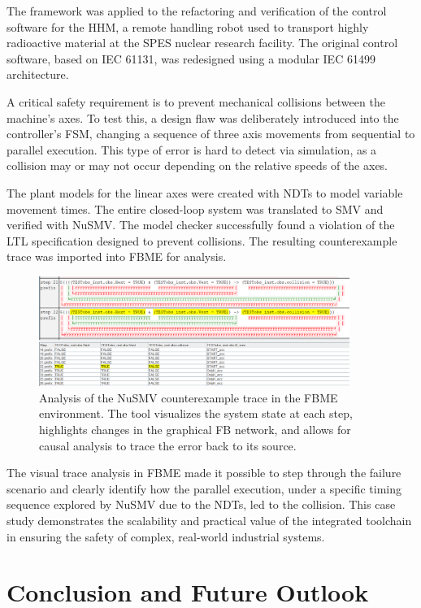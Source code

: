 The framework was applied to the refactoring and verification of the control software for the HHM, a remote handling robot used to transport highly radioactive material at the SPES nuclear research facility. The original control software, based on IEC 61131, was redesigned using a modular IEC 61499 architecture.

A critical safety requirement is to prevent mechanical collisions between the machine's axes. To test this, a design flaw was deliberately introduced into the controller's FSM, changing a sequence of three axis movements from sequential to parallel execution. This type of error is hard to detect via simulation, as a collision may or may not occur depending on the relative speeds of the axes.

The plant models for the linear axes were created with NDTs to model variable movement times. The entire closed-loop system was translated to SMV and verified with NuSMV. The model checker successfully found a violation of the LTL specification designed to prevent collisions. The resulting counterexample trace was imported into FBME for analysis.

\begin{figure}[h]
\centering
\includegraphics[width=0.9\textwidth]{MX_Papers/Paper3/pic/vizu_jumeauV1.png}
\caption{Analysis of the NuSMV counterexample trace in the FBME environment. The tool visualizes the system state at each step, highlights changes in the graphical FB network, and allows for causal analysis to trace the error back to its source.}
\label{fig:counterexample_analysis}
\end{figure}

The visual trace analysis in FBME made it possible to step through the failure scenario and clearly identify how the parallel execution, under a specific timing sequence explored by NuSMV due to the NDTs, led to the collision. This case study demonstrates the scalability and practical value of the integrated toolchain in ensuring the safety of complex, real-world industrial systems.

\section{Conclusion and Future Outlook}\label{sec:conclusion}

